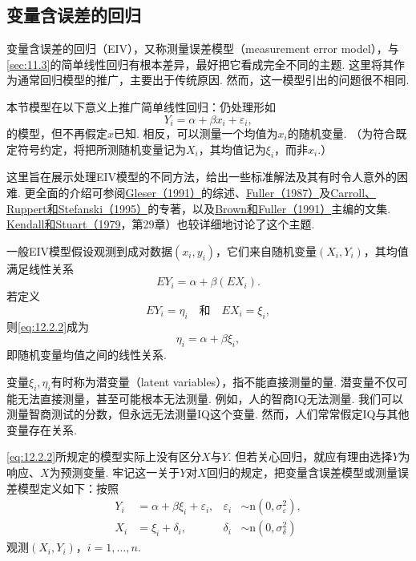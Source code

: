 \subsection{变量含误差的回归}\label{sec:12.2}
变量含误差的回归（EIV），又称测量误差模型（measurement error model），与\autoref{sec:11.3}的简单线性回归有根本差异，最好把它看成完全不同的主题. 这里将其作为通常回归模型的推广，主要出于传统原因. 然而，这一模型引出的问题很不相同.

本节模型在以下意义上推广简单线性回归：仍处理形如
\begin{equation}\label{eq:12.2.1}Y_i=\alpha+\beta x_i+\varepsilon_i,\end{equation}
的模型，但不再假定$x$已知. 相反，可以测量一个均值为$x_i$的随机变量. （为符合既定符号约定，将把所测随机变量记为$X_i$，其均值记为$\xi_i$，而非$x_i$.）

这里旨在展示处理EIV模型的不同方法，给出一些标准解法及其有时令人意外的困难. 更全面的介绍可参阅\hyperref[bib:source147]{Gleser（1991）}的综述、\hyperref[bib:source130]{Fuller（1987）}及\hyperref[bib:source62]{Carroll、Ruppert和Stefanski（1995）}的专著，以及\hyperref[bib:source55]{Brown和Fuller（1991）}主编的文集. \hyperref[bib:source189]{Kendall和Stuart（1979}，第29章）也较详细地讨论了这个主题.

一般EIV模型假设观测到成对数据$(x_i,y_i)$，它们来自随机变量$(X_i,Y_i)$，其均值满足线性关系
\begin{equation}\label{eq:12.2.2}EY_i=\alpha+\beta(EX_i).\end{equation}
若定义
$$EY_i=\eta_i\quad\text{和}\quad EX_i=\xi_i,$$
则\eqref{eq:12.2.2}成为
\begin{equation}\label{eq:12.2.3}\eta_i=\alpha+\beta\xi_i,\end{equation}
即随机变量均值之间的线性关系.

变量$\xi_i,\eta_i$有时称为潜变量（latent variables），指不能直接测量的量. 潜变量不仅可能无法直接测量，甚至可能根本无法测量. 例如，人的智商IQ无法测量. 我们可以测量智商测试的分数，但永远无法测量IQ这个变量. 然而，人们常常假定IQ与其他变量存在关系.

\eqref{eq:12.2.2}所规定的模型实际上没有区分$X$与$Y$. 但若关心回归，就应有理由选择$Y$为响应、$X$为预测变量. 牢记这一关于$Y$对$X$回归的规定，把变量含误差模型或测量误差模型定义如下：按照
\begin{equation}\label{eq:12.2.4}
\begin{aligned}Y_i&=\alpha+\beta\xi_i+\varepsilon_i,&\varepsilon_i&\sim\mathrm n(0,\sigma_\varepsilon^2),\\
X_i&=\xi_i+\delta_i,&\delta_i&\sim\mathrm n(0,\sigma_\delta^2)
\end{aligned}
\end{equation}
观测$(X_i,Y_i)$，$i=1,\ldots,n$.

